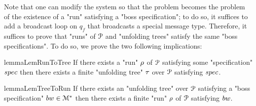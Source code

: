 

Note that one can modify the system so that the \COVER problem becomes the problem of the existence of a "run" satisfying a "boss specification"; to do so, it suffices to add a broadcast loop on $q_f$ that broadcasts a special message type. Therefore, it suffices to prove that "runs" of $\mathcal{P}$ and "unfolding trees" satisfy the same "boss specifications". To do so, we prove the two following implications:

\begin{restatable}{lemma}{LemRunToTree}
	\label{lem:run-to-tree}
	If there exists a "run" $\rho$ of $\mathcal{P}$ satisfying some "specification" $\spec$ then there exists a finite "unfolding tree" $\tau$ over $\mathcal{P}$ satisfying $\spec$.
\end{restatable}

\begin{restatable}{lemma}{LemTreeToRun}
	\label{lem:tree-to-run}
	If there exists an "unfolding tree" over $\mathcal{P}$ satisfying a "boss specification" $\bossspec \in \messages^*$ then there exists a finite "run" $\rho$ of $\mathcal{P}$ satisfying $\bossspec$.
\end{restatable}


	

